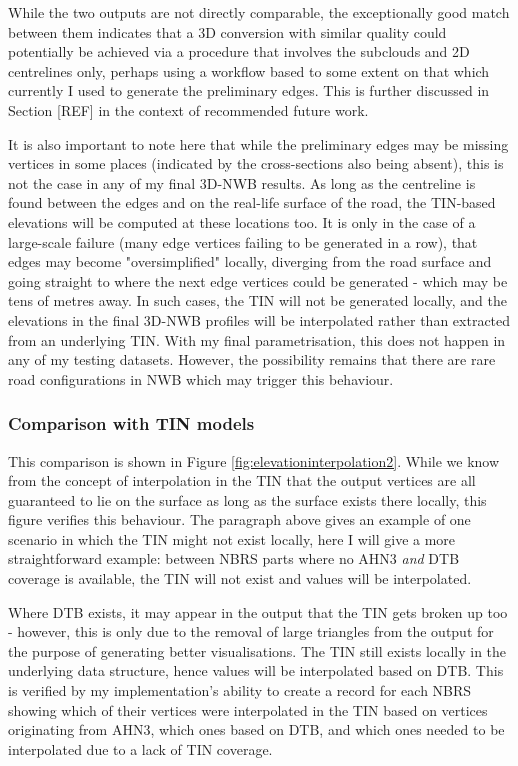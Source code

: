 While the two outputs are not directly comparable, the exceptionally good match between them indicates that a 3D conversion with similar quality could potentially be achieved via a procedure that involves the subclouds and 2D centrelines only, perhaps using a workflow based to some extent on that which currently I used to generate the preliminary edges. This is further discussed in Section [REF] in the context of recommended future work.

It is also important to note here that while the preliminary edges may be missing vertices in some places (indicated by the cross-sections also being absent), this is not the case in any of my final 3D-NWB results. As long as the centreline is found between the edges and on the real-life surface of the road, the TIN-based elevations will be computed at these locations too. It is only in the case of a large-scale failure (many edge vertices failing to be generated in a row), that edges may become "oversimplified" locally, diverging from the road surface and going straight to where the next edge vertices could be generated - which may be tens of metres away. In such cases, the TIN will not be generated locally, and the elevations in the final 3D-NWB profiles will be interpolated rather than extracted from an underlying TIN. With my final parametrisation, this does not happen in any of my testing datasets. However, the possibility remains that there are rare road configurations in NWB which may trigger this behaviour.

\subsubsection{Comparison with TIN models}

This comparison is shown in Figure \ref{fig:elevationinterpolation2}. While we know from the concept of interpolation in the TIN that the output vertices are all guaranteed to lie on the surface as long as the surface exists there locally, this figure verifies this behaviour. The paragraph above gives an example of one scenario in which the TIN might not exist locally, here I will give a more straightforward example: between NBRS parts where no AHN3 \textit{and} DTB coverage is available, the TIN will not exist and values will be interpolated.

Where DTB exists, it may appear in the output that the TIN gets broken up too - however, this is only due to the removal of large triangles from the output for the purpose of generating better visualisations. The TIN still exists locally in the underlying data structure, hence values will be interpolated based on DTB. This is verified by my implementation's ability to create a record for each NBRS showing which of their vertices were interpolated in  the TIN based on vertices originating from AHN3, which ones based on DTB, and which ones needed to be interpolated due to a lack of TIN coverage.

